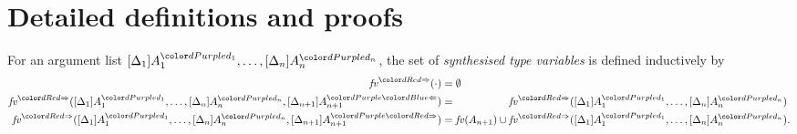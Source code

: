 
\section{Detailed definitions and proofs}\label{sec:defs-proofs}

\begin{definition}\label{def:syn-var}
  For an argument list $\biargs$, the set of \emph{synthesised type variables} is defined inductively by 
  \begin{align*}
    \synvar(\cdot)                   & = \emptyset  \\
    \synvar(\biargs, \chkbiarg[n+1]) & = \phantom{\fv(A_{n+1}) \cup {}} \synvar(\biargs) \\
    \synvar(\biargs, \synbiarg[n+1]) & = \fv(A_{n+1}) \cup           \synvar(\biargs).
  \end{align*}
\end{definition}
